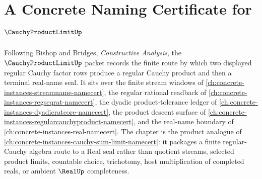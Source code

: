 \chapter{A Concrete Naming Certificate for $\CauchyProductLimitUp$}
\label{ch:concrete-instances-cauchy-product-limit-namecert}

Following Bishop and Bridges, \emph{Constructive Analysis}, the $\CauchyProductLimitUp$ packet records the finite route by which two displayed regular Cauchy factor rows produce a regular Cauchy product and then a terminal real-name seal. It sits over the finite stream windows of \autoref{ch:concrete-instances-streamname-namecert}, the regular rational readback of \autoref{ch:concrete-instances-regseqrat-namecert}, the dyadic product-tolerance ledger of \autoref{ch:concrete-instances-dyadicratcore-namecert}, the product descent surface of \autoref{ch:concrete-instances-regularcauchyproduct-namecert}, and the real-name boundary of \autoref{ch:concrete-instances-real-namecert}. The chapter is the product analogue of \autoref{ch:concrete-instances-cauchy-sum-limit-namecert}: it packages a finite regular-Cauchy algebra route to a Real seal rather than quotient streams, selected product limits, countable choice, trichotomy, host multiplication of completed reals, or ambient $\RealUp$ completeness.

